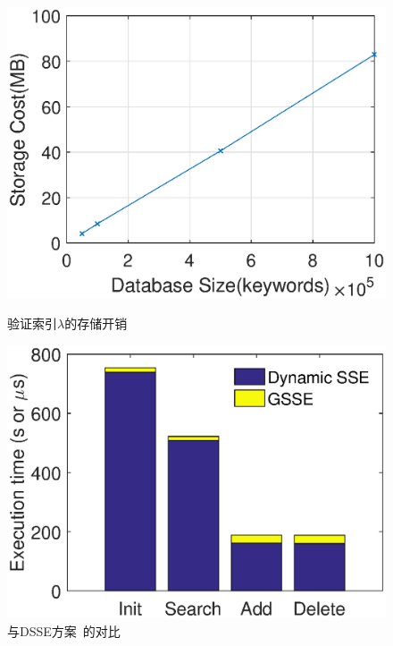 \begin{figure}[bhpt]
\centering
  \begin{minipage}[b]{0.48 \textwidth}
    \includegraphics[width=\textwidth]{expr/storage}
    \caption{验证索引$\lambda$的存储开销 }
    \label{fig:storage}
  \end{minipage}
  \begin{minipage}[b]{0.48 \textwidth}
    \includegraphics[width=\textwidth]{expr/comparison}
    \caption{与DSSE方案~\cite{cash2014dynamic}的对比}
    \label{fig:comparison}
  \end{minipage}
\centering
\end{figure}
